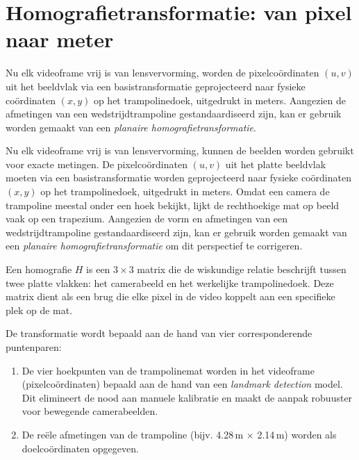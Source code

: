 
\section{Homografietransformatie: van pixel naar meter}
\label{sec:homografie}

Nu elk videoframe vrij is van lensvervorming, worden de pixelcoördinaten $(u, v)$ uit het beeldvlak via een basistransformatie geprojecteerd naar fysieke coördinaten $(x, y)$ op het trampolinedoek, uitgedrukt in meters. Aangezien de afmetingen van een wedstrijdtrampoline gestandaardiseerd zijn, kan er gebruik worden gemaakt van een \textit{planaire homografietransformatie}.

Nu elk videoframe vrij is van lensvervorming, kunnen de beelden worden gebruikt voor exacte metingen. De pixelcoördinaten $(u, v)$ uit het platte beeldvlak moeten via een basistransformatie worden geprojecteerd naar fysieke coördinaten $(x, y)$ op het trampolinedoek, uitgedrukt in meters. Omdat een camera de trampoline meestal onder een hoek bekijkt, lijkt de rechthoekige mat op beeld vaak op een trapezium. Aangezien de vorm en afmetingen van een wedstrijdtrampoline gestandaardiseerd zijn, kan er gebruik worden gemaakt van een \textit{planaire homografietransformatie} om dit perspectief te corrigeren.

Een homografie $H$ is een $3 \times 3$ matrix die de wiskundige relatie beschrijft tussen twee platte vlakken: het camerabeeld en het werkelijke trampolinedoek. Deze matrix dient als een brug die elke pixel in de video koppelt aan een specifieke plek op de mat.

De transformatie wordt bepaald aan de hand van vier corresponderende puntenparen:
\begin{enumerate}
    \item De vier hoekpunten van de trampolinemat worden in het videoframe (pixelcoördinaten) bepaald aan de hand van een \textit{landmark detection} model. Dit elimineert de nood aan manuele kalibratie en maakt de aanpak robuuster voor bewegende camerabeelden.
    \item De re{\"e}le afmetingen van de trampoline (bijv. 4.28\,m $\times$ 2.14\,m) worden als doelcoördinaten opgegeven. %
\end{enumerate}

